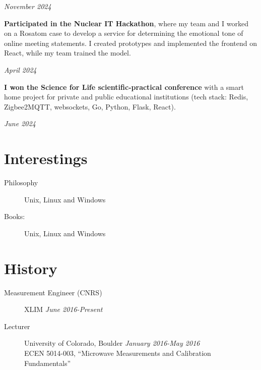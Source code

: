 \documentclass[margin,line]{resume}
\begin{document}
\begin{resume}
  \hfill \textsl{November 2024}

  \textbf{Participated in the Nuclear IT Hackathon}, where my team
  and I worked on a Rosatom case to develop a service for determining
  the emotional tone of online meeting statements. I created
  prototypes and implemented the frontend on React, while my team
  trained the model.
  \vspace{-6mm}

  \hfill \textsl{April 2024}

  \textbf{I won the Science for Life scientific-practical
  conference} with a smart home project for private and public
  educational institutions (tech stack: Redis, Zigbee2MQTT,
  websockets, Go, Python, Flask, React).
  \vspace{-6mm}

  \hfill \textsl{June 2024}

  \section{\mysidestyle Interestings}\vspace{2mm}
  \begin{description}
    \item[Philosophy] Unix, Linux and Windows
    \item[Books:] Unix, Linux and Windows
  \end{description}

  \vfill


  \section{\mysidestyle History}\vspace{2mm}

  \begin{description}

    \item[Measurement Engineer (CNRS)]\small{XLIM \hfill \textsl{June
      2016-Present}}\\
    \item[Lecturer]\small{University of Colorado, Boulder \hfill
      \textsl{January 2016-May 2016}}\\
      ECEN 5014-003, ``Microwave Measurements and Calibration Fundamentals''
      \vspace{2mm}


\end{description}
\end{resume}
\end{document}
